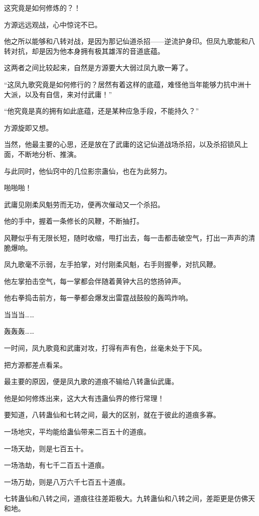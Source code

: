 \begin{this_body}
这究竟是如何修炼的？！

方源远远观战，心中惊诧不已。

他之所以能够和八转对战，是因为那记仙道杀招——逆流护身印。但凤九歌能和八转对抗，却是因为他本身拥有极其雄浑的音道底蕴。

这两者之间比较起来，自然是方源要大大弱过凤九歌一筹了。

“这凤九歌究竟是如何修行的？居然有着这样的底蕴，难怪他当年能够力抗中洲十大派，以及有自信，来对付武庸！”

“他究竟是真的拥有如此底蕴，还是某种应急手段，不能持久？”

方源旋即又想。

当然，他最主要的心思，还是放在了武庸的这记仙道战场杀招，以及杀招锁风上面，不断地分析、推演。

与此同时，他仙窍中的几位影宗蛊仙，也在为此努力。

啪啪啪！

武庸见刚柔风魁劳而无功，便再次催动又一个杀招。

他的手中，握着一条修长的风鞭，不断抽打。

风鞭似乎有无限长短，随时收缩，甩打出去，每一击都击破空气，打出一声声的清脆爆响。

凤九歌毫不示弱，左手拍掌，对付刚柔风魁，右手则握拳，对抗风鞭。

他左掌拍击空气，每一掌都会伴随着黄钟大吕的悠扬钟声。

他右拳捣击前方，每一拳都会爆发出雷霆战鼓般的轰鸣炸响。

当当当……

轰轰轰……

一时间，凤九歌竟和武庸对攻，打得有声有色，丝毫未处于下风。

把方源都差点看呆。

最主要的原因，便是凤九歌的道痕不输给八转蛊仙武庸。

他是如何修炼出来，这大大有违蛊仙界的修行常理！

要知道，八转蛊仙和七转之间，最大的区别，就在于彼此的道痕多寡。

一场地灾，平均能给蛊仙带来二百五十的道痕。

一场天劫，则是七百五十。

一场浩劫，有七千二百五十道痕。

一场万劫，则是八万六千七百五十道痕。

七转蛊仙和八转之间，道痕往往差距极大。九转蛊仙和八转之间，差距更是仿佛天和地。


\end{this_body}
